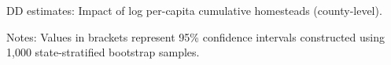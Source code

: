 \documentclass[12pt]{article}
\begin{document}
\begin{table}[htbp]
	\begin{center}
				\caption{DD estimates: Impact of log per-capita cumulative homesteads (county-level). \label{dd-mechanisms}}
		\resizebox{.8\width}{!}{}
\end{center}
	\footnotesize{Notes: Values in brackets represent 95\% confidence intervals constructed using 1,000 state-stratified bootstrap samples.}
\end{table}

\pagebreak





\itemize
\end{document}
